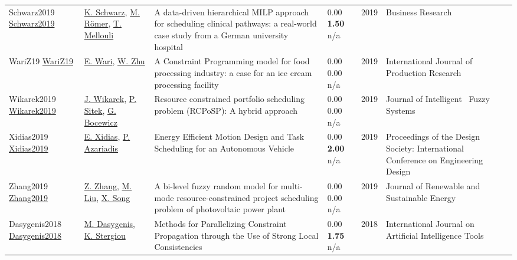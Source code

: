 {\begin{longtable}{p{3cm}p{5cm}p{10cm}p{1cm}rp{2.5cm}l}
Schwarz2019 \href{http://dx.doi.org/10.1007/s40685-019-00102-z}{Schwarz2019} & \hyperref[auth:a2013]{K. Schwarz}, \hyperref[auth:a2014]{M. Römer}, \hyperref[auth:a2015]{T. Mellouli} & \cellcolor{gold!20}A data-driven hierarchical MILP approach for scheduling clinical pathways: a real-world case study from a German university hospital & \noindent{}\textcolor{black!50}{0.00} \textbf{1.50} n/a & 2019 & Business Research & \cite{Schwarz2019}\\
WariZ19 \href{http://dx.doi.org/10.1080/00207543.2019.1571250}{WariZ19} & \hyperref[auth:a839]{E. Wari}, \hyperref[auth:a840]{W. Zhu} & A Constraint Programming model for food processing industry: a case for an ice cream processing facility & \noindent{}\textcolor{black!50}{0.00} \textcolor{black!50}{0.00} n/a & 2019 & \cellcolor{red!20}International Journal of Production Research & \cite{WariZ19}\\
Wikarek2019 \href{http://dx.doi.org/10.3233/jifs-179364}{Wikarek2019} & \hyperref[auth:a1476]{J. Wikarek}, \hyperref[auth:a1475]{P. Sitek}, \hyperref[auth:a630]{G. Bocewicz} & Resource constrained portfolio scheduling problem (RCPoSP): A hybrid approach & \noindent{}\textcolor{black!50}{0.00} \textcolor{black!50}{0.00} n/a & 2019 & Journal of Intelligent \  Fuzzy Systems & \cite{Wikarek2019}\\
Xidias2019 \href{http://dx.doi.org/10.1017/dsi.2019.292}{Xidias2019} & \hyperref[auth:a1989]{E. Xidias}, \hyperref[auth:a1990]{P. Azariadis} & \cellcolor{gold!20}Energy Efficient Motion Design and Task Scheduling for an Autonomous Vehicle & \noindent{}\textcolor{black!50}{0.00} \textbf{2.00} n/a & 2019 & Proceedings of the Design Society: International Conference on Engineering Design & \cite{Xidias2019}\\
Zhang2019 \href{http://dx.doi.org/10.1063/1.5053623}{Zhang2019} & \hyperref[auth:a1745]{Z. Zhang}, \hyperref[auth:a1746]{M. Liu}, \hyperref[auth:a1747]{X. Song} & A bi-level fuzzy random model for multi-mode resource-constrained project scheduling problem of photovoltaic power plant & \noindent{}\textcolor{black!50}{0.00} \textcolor{black!50}{0.00} n/a & 2019 & Journal of Renewable and Sustainable Energy & \cite{Zhang2019}\\
Dasygenis2018 \href{http://dx.doi.org/10.1142/s0218213018600023}{Dasygenis2018} & \hyperref[auth:a2000]{M. Dasygenis}, \hyperref[auth:a2001]{K. Stergiou} & Methods for Parallelizing Constraint Propagation through the Use of Strong Local Consistencies & \noindent{}\textcolor{black!50}{0.00} \textbf{1.75} n/a & 2018 & International Journal on Artificial Intelligence Tools & \cite{Dasygenis2018}\\

\end{longtable}}
